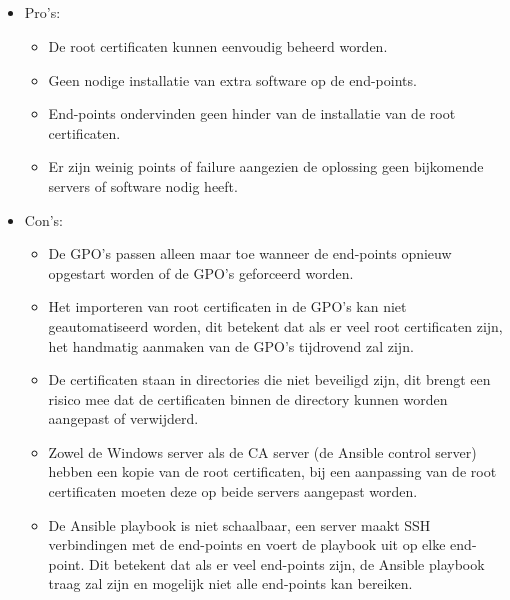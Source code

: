 \subsection{}
\label{subsec:Pros_en_Cons_van_de_eerste_oplossing}
\begin{itemize}
    \item Pro's:
    \begin{itemize}
        \item De root certificaten kunnen eenvoudig beheerd worden.
        \item Geen nodige installatie van extra software op de end-points.
        \item End-points ondervinden geen hinder van de installatie van de root certificaten.
        \item Er zijn weinig points of failure aangezien de oplossing geen bijkomende servers of software nodig heeft.
    \end{itemize}
    \item Con's:
    \begin{itemize}
        \item De GPO's passen alleen maar toe wanneer de end-points opnieuw opgestart worden of de GPO's geforceerd worden.
        \item Het importeren van root certificaten in de GPO's kan niet geautomatiseerd worden, dit betekent dat als er veel root certificaten zijn, het handmatig aanmaken van de GPO's tijdrovend zal zijn.
        \item De certificaten staan in directories die niet beveiligd zijn, dit brengt een risico mee dat de certificaten binnen de directory kunnen worden aangepast of verwijderd.
        \item Zowel de Windows server als de CA server (de Ansible control server) hebben een kopie van de root certificaten, bij een aanpassing van de root certificaten moeten deze op beide servers aangepast worden.
        \item De Ansible playbook is niet schaalbaar, een server maakt SSH verbindingen met de end-points en voert de playbook uit op elke end-point. Dit betekent dat als er veel end-points zijn, de Ansible playbook traag zal zijn en mogelijk niet alle end-points kan bereiken.
    \end{itemize}
\end{itemize}

\section{}%
\label{sec:Tweede_oplossing}
